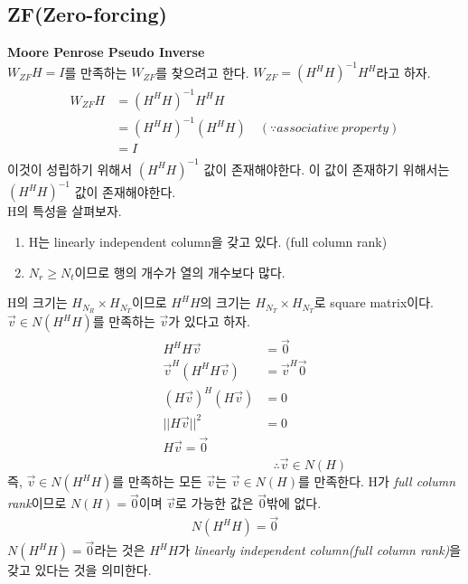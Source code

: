 \documentclass{article}
\newcommand{\bd}{\textbf} %
\begin{document}
\subsection{ZF(Zero-forcing)}
\bd{Moore Penrose Pseudo Inverse}\\
$W_{ZF}H=I$를 만족하는 $W_{ZF}$를 찾으려고 한다. $W_{ZF}=(H^H H)^{-1}H^H$라고 하자.
\begin{gather}
	\begin{split}
		W_{ZF}H&=(H^H H)^{-1}H^H H\\
		&=(H^H H)^{-1}(H^H H) \quad (\because associative\ property)\\
		&=I
	\end{split}
\end{gather}
이것이 성립하기 위해서 $(H^H H)^{-1}$ 값이 존재해야한다. 이 값이 존재하기 위해서는 $(H^H H)^{-1}$ 값이 존재해야한다.\\

\noindent
H의 특성을 살펴보자.
\begin{enumerate}
  \item H는 linearly independent column을 갖고 있다. (full column rank)
  \item $N_r\geq N_t$이므로 행의 개수가 열의 개수보다 많다.
\end{enumerate}
H의 크기는 $H_{N_R}\times H_{N_T}$이므로 $H^H H$의 크기는 $H_{N_T}\times H_{N_T}$로 square matrix이다.\\
\newpage
\noindent
$\vec{v} \in N(H^H H)$를 만족하는 $\vec{v}$가 있다고 하자.
\begin{gather}
\begin{split}
H^H H \vec{v} &= \vec{0}\\
\vec{v}^H(H^H H \vec{v})&=\vec{v}^H\vec{0}\\
(H\vec{v})^H(H \vec{v})&=0\\
||H\vec{v}||^2&=0\\
H\vec{v}=\vec{0}
\end{split}
\end{gather}
\vspace{0.1cm}
\begin{equation}
\hspace{5cm}\therefore \vec{v} \in N(H)
\end{equation}
즉, $\vec{v} \in N(H^H H)$를 만족하는 모든 $\vec{v}$는 $\vec{v} \in N(H)$를 만족한다. 
H가 \textsl{full column rank}이므로 $N(H)=\vec{0}$이며 $\vec{v}$로 가능한 값은 $\vec{0}$밖에 없다.
\begin{gather}
N(H^H H)=\vec{0}
\end{gather}
$N(H^H H)=\vec{0}$라는 것은 $H^H H$가 \textsl{linearly independent column(full column rank)}을 갖고 있다는 것을 의미한다.\\
\end{document}
